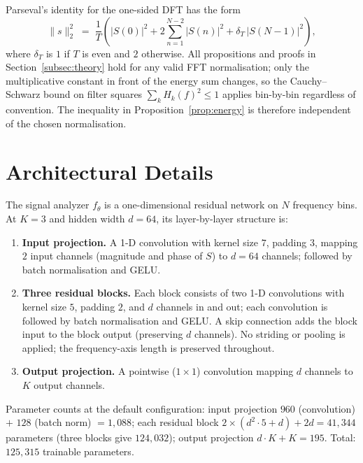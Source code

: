 \documentclass[journal]{IEEEtran}
\theoremstyle{remark}
\begin{document}
Parseval's identity for the one-sided DFT has the form
\begin{equation}
\|s\|_{2}^{2} \;=\; \frac{1}{T}\!\left(
  \lvert S(0)\rvert^{2}
  + 2\!\!\!\!\sum_{n=1}^{N-2}\!\!\!\!\lvert S(n)\rvert^{2}
  + \delta_{T}\,\lvert S(N-1)\rvert^{2}\right),
\end{equation}
where $\delta_{T}$ is $1$ if $T$ is even and $2$ otherwise. All
propositions and proofs in Section~\ref{subsec:theory} hold for any
valid FFT normalisation; only the multiplicative constant in front of
the energy sum changes, so the Cauchy--Schwarz bound on filter squares
$\sum_{k}H_{k}(f)^{2} \leq 1$ applies bin-by-bin regardless of
convention. The inequality in Proposition~\ref{prop:energy} is
therefore independent of the chosen normalisation.

\section{Architectural Details}
\label{app:arch}

The signal analyzer $f_{\theta}$ is a one-dimensional residual network
on $N$ frequency bins. At $K=3$ and hidden width $d=64$, its
layer-by-layer structure is:
\begin{enumerate}
\item \textbf{Input projection.} A 1-D convolution with kernel size
  $7$, padding $3$, mapping $2$ input channels (magnitude and phase of
  $S$) to $d=64$ channels; followed by batch normalisation and GELU.
\item \textbf{Three residual blocks.} Each block consists of two 1-D
  convolutions with kernel size $5$, padding $2$, and $d$ channels in
  and out; each convolution is followed by batch normalisation and
  GELU. A skip connection adds the block input to the block output
  (preserving $d$ channels). No striding or pooling is applied; the
  frequency-axis length is preserved throughout.
\item \textbf{Output projection.} A pointwise ($1{\times}1$)
  convolution mapping $d$ channels to $K$ output channels.
\end{enumerate}
Parameter counts at the default configuration: input projection $960$
(convolution) $+$ $128$ (batch norm) $= 1{,}088$; each residual block
$2 \times (d^{2}\cdot 5 + d) + 2d = 41{,}344$ parameters (three blocks
give $124{,}032$); output projection $d \cdot K + K = 195$. Total:
$125{,}315$ trainable parameters.
\end{document}
